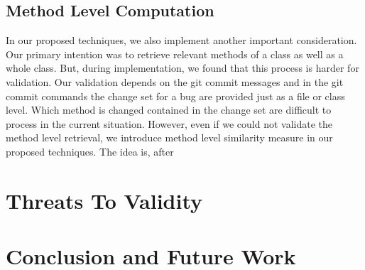 \documentclass[conference]{IEEEtran}
\begin{document}
\subsection{Method Level Computation}
In our proposed techniques, we also implement another important consideration. Our primary intention was to retrieve relevant methods of a class as well as a whole class. But, during implementation, we found that this process is harder for validation. Our validation depends on the git commit messages and in the git commit commands the change set for a bug are provided just as a file or class level. Which method is changed contained in the change set are difficult to process in the current situation. However, even if we could not validate the method level retrieval, we introduce method level similarity measure in our proposed techniques. The idea is, after 

\section{Threats To Validity}\label{sec:threats}


\section{Conclusion and Future Work}\label{summary}




\scriptsize

\end{document}
